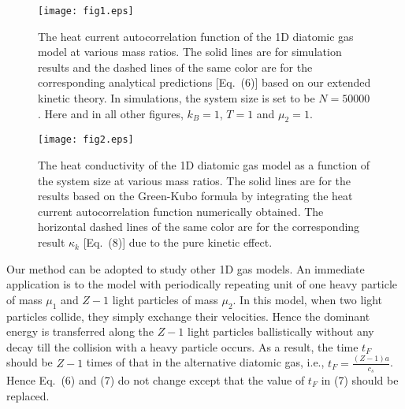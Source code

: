 \documentclass[twocolumn,secnumarabic,amssymb, nobibnotes, aps, pre,superscriptaddress]{revtex4}
\begin{document}

    \begin{figure}[!t]
    \centering
    \texttt{[image: fig1.eps]}
    \caption{The heat current autocorrelation function of the 1D diatomic gas model at various mass ratios. The solid lines are for simulation results and the dashed lines of the same color are for the corresponding analytical predictions [Eq.~(6)] based on our extended kinetic theory. In simulations, the system size is set to be $N=50000$. Here and in all other figures, $k_B=1$, $T=1$ and $\mu_2=1$.}
    \end{figure}

    \begin{figure}[!t]
    \centering
    \texttt{[image: fig2.eps]}
    \caption{The heat conductivity of the 1D diatomic gas model as a function of the system size at various mass ratios. The solid lines are for the results based on the Green-Kubo formula by integrating the heat current autocorrelation function numerically obtained. The horizontal dashed lines of the same color are for the corresponding result $\kappa_{k}$ [Eq.~(8)] due to the pure kinetic effect. }
    \end{figure}


Our method can be adopted to study other 1D gas models. An immediate application is to the model with periodically repeating unit of one heavy particle of mass $\mu_1$ and $Z-1$ light particles of mass $\mu_2$. In this model,  when two light particles collide, they simply exchange their velocities. Hence the dominant energy is transferred along the $Z-1$ light particles ballistically without any decay till the collision with a heavy particle occurs. As a result, the time $t_F$ should be $Z-1$ times of that in the alternative diatomic gas, i.e., $t_F=\frac{(Z-1)a}{c_s}$. Hence Eq.~(6) and (7) do not change except that the value of $t_F$ in (7) should be replaced. 
\end{document}
